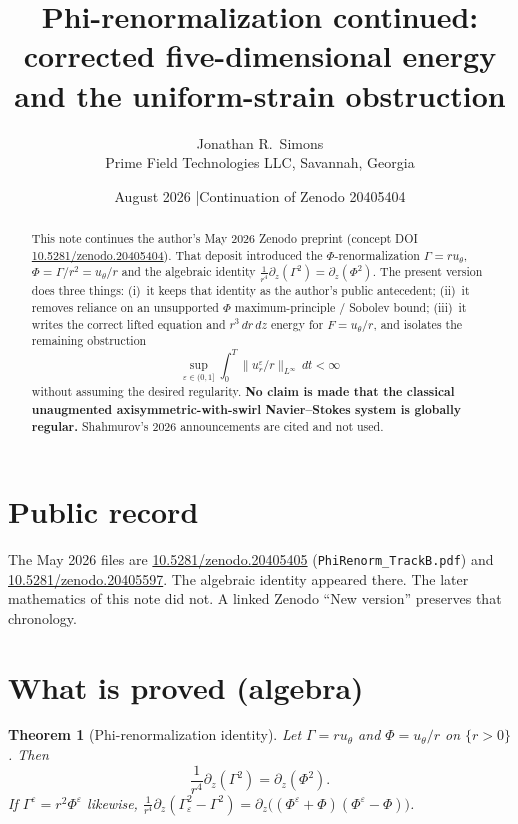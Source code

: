 \documentclass[11pt]{article}
\title{Phi-renormalization continued:\\
corrected five-dimensional energy and the uniform-strain obstruction}
\author{Jonathan R.\ Simons\\
Prime Field Technologies LLC, Savannah, Georgia}
\date{August 2026 \quad|\quad Continuation of Zenodo 20405404}
\newtheorem{theorem}{Theorem}[section]
\newcommand{\eps}{\varepsilon}
\newcommand{\norm}[2]{\|#1\|_{#2}}
\begin{document}
\maketitle

\begin{abstract}
This note continues the author's May 2026 Zenodo preprint
(concept DOI \href{https://doi.org/10.5281/zenodo.20405404}{10.5281/zenodo.20405404}).
That deposit introduced the \(\Phi\)-renormalization
\(\Gamma=ru_\theta\), \(\Phi=\Gamma/r^2=u_\theta/r\) and the algebraic identity
\(\frac1{r^4}\partial_z(\Gamma^2)=\partial_z(\Phi^2)\).
The present version does three things: (i)~it keeps that identity as the
author's public antecedent; (ii)~it removes reliance on an unsupported
\(\Phi\) maximum-principle / Sobolev bound; (iii)~it writes the correct
lifted equation and \(r^3\,dr\,dz\) energy for \(F=u_\theta/r\), and
isolates the remaining obstruction
\[
  \sup_{\eps\in(0,1]}\int_0^T \norm{u_r^\eps/r}{L^\infty}\,dt<\infty
\]
without assuming the desired regularity.
\textbf{No claim is made that the classical unaugmented axisymmetric-with-swirl
Navier--Stokes system is globally regular.}
Shahmurov's 2026 announcements are cited and not used.
\end{abstract}

\section{Public record}

The May 2026 files are
\href{https://doi.org/10.5281/zenodo.20405405}{10.5281/zenodo.20405405}
(\texttt{PhiRenorm\_TrackB.pdf}) and
\href{https://doi.org/10.5281/zenodo.20405597}{10.5281/zenodo.20405597}.
The algebraic identity appeared there. The later mathematics of this note
did not. A linked Zenodo ``New version'' preserves that chronology.

\section{What is proved (algebra)}

\begin{theorem}[Phi-renormalization identity]
Let \(\Gamma=ru_\theta\) and \(\Phi=u_\theta/r\) on \(\{r>0\}\). Then
\[
  \frac1{r^4}\partial_z(\Gamma^2)=\partial_z(\Phi^2).
\]
If \(\Gamma^\eps=r^2\Phi^\eps\) likewise,
\(\frac1{r^4}\partial_z(\Gamma_\eps^2-\Gamma^2)
=\partial_z\bigl((\Phi^\eps+\Phi)(\Phi^\eps-\Phi)\bigr)\).
\end{theorem}
\end{document}
